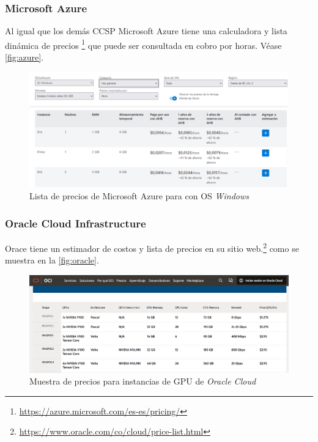 \subsubsection{Microsoft Azure}
Al igual que los demás \acrshort{CCSP} \gls{Microsoft Azure} tiene una calculadora y lista dinámica de precios \footnote{\url{https://azure.microsoft.com/es-es/pricing/}} que puede ser consultada en cobro por horas. Véase \autoref{fig:azure}.
\begin{figure}[h]
    \centering
    \includegraphics[width=\textwidth]{gfx/azure.png}
    \caption{Lista de precios de \gls{Microsoft Azure} para  con \acrshort{OS} \emph{Windows}}
    \label{fig:azure}
\end{figure}

\subsubsection{Oracle Cloud Infrastructure}
Orace tiene un estimador de costos y lista de precios en su sitio web.\footnote {\url{https://www.oracle.com/co/cloud/price-list.html}} como se muestra en la \autoref{fig:oracle}.
\begin{figure}[h]
    \centering
    \includegraphics[width=\textwidth]{gfx/oracle.png}
    \caption{Muestra de precios para instancias de \acrshort{GPU} de \emph{Oracle Cloud}}
    \label{fig:oracle}
\end{figure}

